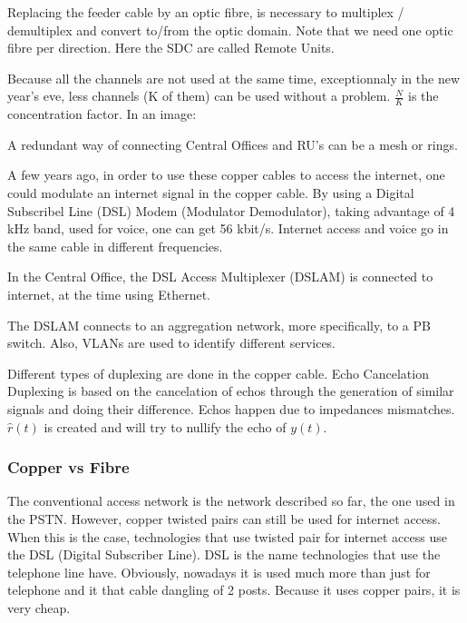 Replacing the feeder cable by an optic fibre, is necessary to multiplex / demultiplex and convert to/from the optic domain. Note that we need one optic fibre per direction. Here the SDC are called Remote Units.

Because all the channels are not used at the same time, exceptionnaly in the new year's eve, less channels (K of them) can be used without a problem. $\frac{N}{K}$ is the concentration factor. In an image:



A redundant way of connecting Central Offices and RU's can be a mesh or rings.



A few years ago, in order to use these copper cables to access the internet, one could modulate an internet signal in the copper cable. By using a Digital Subscribel Line (DSL) Modem (Modulator Demodulator), taking advantage of 4 kHz band, used for voice, one can get 56 kbit/s. Internet access and voice go in the same cable in different frequencies.

In the Central Office, the DSL Access Multiplexer (DSLAM) is connected to internet, at the time using Ethernet.




The DSLAM connects to an aggregation network, more specifically, to a PB switch.
Also, VLANs are used to identify different services.





Different types of duplexing are done in the copper cable.
Echo Cancelation Duplexing is based on the cancelation of echos through the generation of similar signals and doing their difference. Echos happen due to impedances mismatches. $\hat{r}(t)$ is created and will try to nullify the echo of $y(t)$.




\subsubsection{Copper vs Fibre}
The conventional access network is the network described so far, the one used in the PSTN. However, copper twisted pairs can still be used for internet access. When this is the case, technologies that use twisted pair for internet access use the DSL (Digital Subscriber Line). DSL is the name technologies that use the telephone line have. Obviously, nowadays it is used much more than just for telephone and it that cable dangling of 2 posts. Because it uses copper pairs, it is very cheap.

